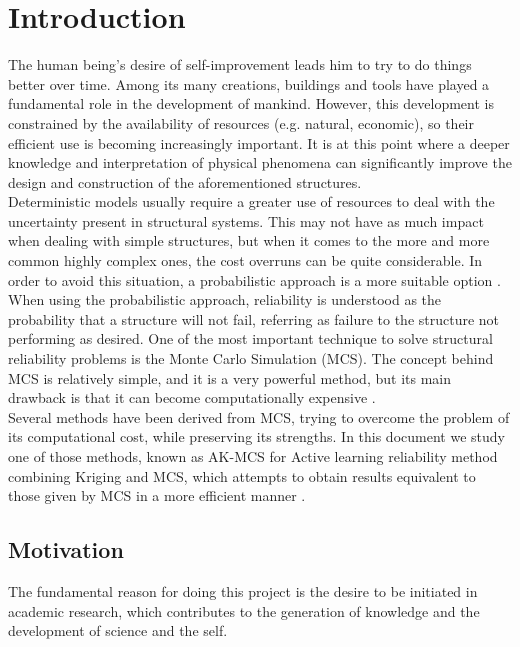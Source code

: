 
\chapter{Introduction}
\label{ch:1}

The human being's desire of self-improvement leads him to try to do things
better over time. Among its many creations, buildings and tools have played a
fundamental role in the development of mankind. However, this development is
constrained by the availability of resources (e.g. natural, economic), so their efficient
use is becoming increasingly important. It is at this point where a deeper knowledge
and interpretation of physical phenomena can significantly improve the design and
construction of the aforementioned structures. \\

Deterministic models usually require a greater use of resources to deal with the uncertainty
present in structural systems. This may not have as much impact when dealing with 
simple structures, but when it comes to the more and more common highly complex ones, the cost
overruns can be quite considerable. In order to avoid this situation, a probabilistic
approach is a more suitable option \citep{Choi2006}.\\

When using the probabilistic approach, reliability is understood as the probability
that a structure will not fail, referring as failure to the structure not performing
as desired. One of the most important technique to solve structural reliability problems
is the Monte Carlo Simulation (MCS). The concept behind MCS is relatively simple, and
it is a very powerful method, but its main drawback is that it can become computationally
expensive \citep{Nowak2000}. \\

Several methods have been derived from MCS, trying to overcome the problem of
its computational cost, while preserving its strengths. In this document we study
one of those methods, known as AK-MCS for Active learning reliability method combining
Kriging and MCS, which attempts to obtain results equivalent to those given by MCS in a 
more efficient manner \citep{Echard2011}.

\section{Motivation}
The fundamental reason for doing this project is the desire to be initiated in academic
research, which contributes to the generation of knowledge and the development of 
science and the self.\\


